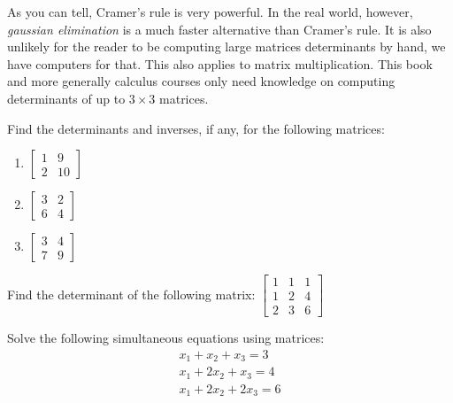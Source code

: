 As you can tell, Cramer's rule is very powerful. In the real world, however, \textit{gaussian elimination} is a much faster alternative than Cramer's rule. It is also unlikely for the reader to be computing large matrices determinants by hand, we have computers for that. This also applies to matrix multiplication. This book and more generally calculus courses only need knowledge on computing determinants of up to \(3\times3\) matrices.
\begin{problem}
  Find the determinants and inverses, if any, for the following matrices: \begin{enumerate}[label=\alph*)]
    \item{\(\begin{bmatrix}
        1 & 9 \\
        2 & 10
    \end{bmatrix} \)}
  \item{\(\begin{bmatrix}
      3 & 2 \\
      6 & 4
  \end{bmatrix} \)}
\item{\(\begin{bmatrix}
    3 & 4 \\
    7 & 9
\end{bmatrix}\)}
  \end{enumerate} 
\end{problem}
\begin{problem}[1]
  Find the determinant of the following matrix: \(
  \begin{bmatrix}
    1 & 1 & 1 \\
    1 & 2 & 4 \\
    2 & 3 & 6
  \end{bmatrix}
  \)
\end{problem}
\begin{problem}[1]
  Solve the following simultaneous equations using matrices: 
  \begin{equation*}
    \begin{array}{l}
      x_1 + x_2 + x_3 = 3 \\
      x_1 + 2x_2 + x_3 = 4 \\
      x_1 + 2x_2 + 2x_3 = 6
    \end{array}
  \end{equation*}
\end{problem}
%
